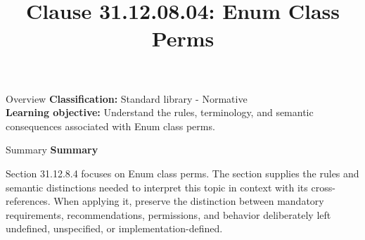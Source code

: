 \documentclass[10pt,letterpaper]{article}
\title{Clause 31.12.08.04: Enum Class Perms}
\author{}
\date{}
\begin{document}
\maketitle
\begin{CornellOverviewBox}{Overview}
\textbf{Classification:} Standard library - Normative\\[2pt]
\textbf{Learning objective:} Understand the rules, terminology, and semantic consequences associated with Enum class perms.
\end{CornellOverviewBox}\begin{CornellSummaryBox}{Summary}
{\sffamily\bfseries\color{Accent} Summary}\par\vspace{3pt}Section 31.12.8.4 focuses on Enum class perms. The section supplies the rules and semantic distinctions needed to interpret this topic in context with its cross-references. When applying it, preserve the distinction between mandatory requirements, recommendations, permissions, and behavior deliberately left undefined, unspecified, or implementation-defined.
\end{CornellSummaryBox}
\end{document}
